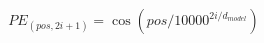 \begin{equation}
    \label{cosPE}
    PE_{(pos,2i+1)} = \cos(pos/10000^{2i/d_{model}})
\end{equation}
